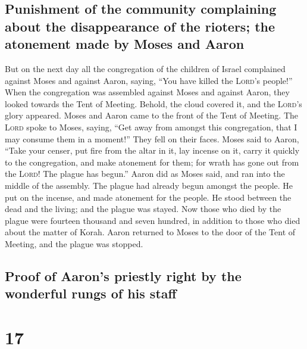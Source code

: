 \hypertarget{punishment-of-the-community-complaining-about-the-disappearance-of-the-rioters-the-atonement-made-by-moses-and-aaron}{%
\subsection{Punishment of the community complaining about the
disappearance of the rioters; the atonement made by Moses and
Aaron}\label{punishment-of-the-community-complaining-about-the-disappearance-of-the-rioters-the-atonement-made-by-moses-and-aaron}}

 But on the next day all the congregation of the children
of Israel complained against Moses and against Aaron, saying, ``You have
killed the \textsc{Lord}'s people!''  When the
congregation was assembled against Moses and against Aaron, they looked
towards the Tent of Meeting. Behold, the cloud covered it, and the
\textsc{Lord}'s glory appeared.  Moses and Aaron came to
the front of the Tent of Meeting.  The \textsc{Lord}
spoke to Moses, saying,  ``Get away from amongst this
congregation, that I may consume them in a moment!'' They fell on their
faces.  Moses said to Aaron, ``Take your censer, put fire
from the altar in it, lay incense on it, carry it quickly to the
congregation, and make atonement for them; for wrath has gone out from
the \textsc{Lord}! The plague has begun.''  Aaron did as
Moses said, and ran into the middle of the assembly. The plague had
already begun amongst the people. He put on the incense, and made
atonement for the people.  He stood between the dead and
the living; and the plague was stayed.  Now those who
died by the plague were fourteen thousand and seven hundred, in addition
to those who died about the matter of Korah.  Aaron
returned to Moses to the door of the Tent of Meeting, and the plague was
stopped.

\hypertarget{proof-of-aarons-priestly-right-by-the-wonderful-rungs-of-his-staff}{%
\subsection{Proof of Aaron's priestly right by the wonderful rungs of
his
staff}\label{proof-of-aarons-priestly-right-by-the-wonderful-rungs-of-his-staff}}

\hypertarget{section-16}{%
\section{17}\label{section-16}}

